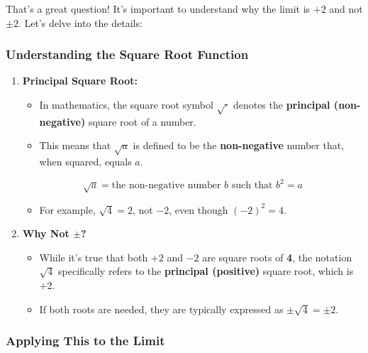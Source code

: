\documentclass[a4paper,12pt]{book}
\begin{document}
That's a great question! It's important to understand why the limit is \textbf{\( +2 \)} and not \textbf{\( \pm 2 \)}. Let's delve into the details:

\subsubsection{Understanding the Square Root Function}
\begin{enumerate}
\item 
\textbf{Principal Square Root:}
\begin{itemize}
\item 
In mathematics, the square root symbol \textbf{\( \sqrt{\cdot} \)} denotes the \textbf{principal (non-negative)} square root of a number.

\item 
This means that \textbf{\( \sqrt{a} \)} is defined to be the \textbf{non-negative} number that, when squared, equals \textbf{\( a \)}.

\end{itemize}

\[
\sqrt{a} = \text{the non-negative number } b \text{ such that } b^2 = a
\]
\begin{itemize}
\item 
For example, \textbf{\( \sqrt{4} = 2 \)}, not \textbf{\( -2 \)}, even though \textbf{\( (-2)^2 = 4 \)}.

\end{itemize}

\item 
\textbf{Why Not \( \pm \)?}
\begin{itemize}
\item 
While it's true that both \textbf{\( +2 \)} and \textbf{\( -2 \)} are square roots of \textbf{4}, the notation \textbf{\( \sqrt{4} \)} specifically refers to the \textbf{principal (positive)} square root, which is \textbf{\( +2 \)}.

\item 
If both roots are needed, they are typically expressed as \textbf{\( \pm\sqrt{4} = \pm 2 \)}.

\end{itemize}

\end{enumerate}

\subsubsection{Applying This to the Limit}
\end{document}
